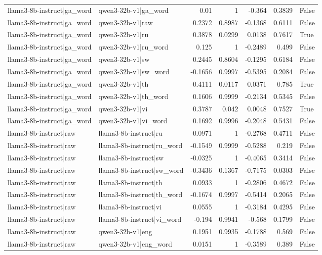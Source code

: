 \begin{table}
\begin{tabular}{l l r r r r l}
llama3-8b-instruct|ga_word & qwen3-32b-v1|ga_word & 0.01 & 1 & -0.364 & 0.3839 & False \\
llama3-8b-instruct|ga_word & qwen3-32b-v1|raw & 0.2372 & 0.8987 & -0.1368 & 0.6111 & False \\
llama3-8b-instruct|ga_word & qwen3-32b-v1|ru & 0.3878 & 0.0299 & 0.0138 & 0.7617 & True \\
llama3-8b-instruct|ga_word & qwen3-32b-v1|ru_word & 0.125 & 1 & -0.2489 & 0.499 & False \\
llama3-8b-instruct|ga_word & qwen3-32b-v1|sw & 0.2445 & 0.8604 & -0.1295 & 0.6184 & False \\
llama3-8b-instruct|ga_word & qwen3-32b-v1|sw_word & -0.1656 & 0.9997 & -0.5395 & 0.2084 & False \\
llama3-8b-instruct|ga_word & qwen3-32b-v1|th & 0.4111 & 0.0117 & 0.0371 & 0.785 & True \\
llama3-8b-instruct|ga_word & qwen3-32b-v1|th_word & 0.1606 & 0.9999 & -0.2134 & 0.5345 & False \\
llama3-8b-instruct|ga_word & qwen3-32b-v1|vi & 0.3787 & 0.042 & 0.0048 & 0.7527 & True \\
llama3-8b-instruct|ga_word & qwen3-32b-v1|vi_word & 0.1692 & 0.9996 & -0.2048 & 0.5431 & False \\
llama3-8b-instruct|raw & llama3-8b-instruct|ru & 0.0971 & 1 & -0.2768 & 0.4711 & False \\
llama3-8b-instruct|raw & llama3-8b-instruct|ru_word & -0.1549 & 0.9999 & -0.5288 & 0.219 & False \\
llama3-8b-instruct|raw & llama3-8b-instruct|sw & -0.0325 & 1 & -0.4065 & 0.3414 & False \\
llama3-8b-instruct|raw & llama3-8b-instruct|sw_word & -0.3436 & 0.1367 & -0.7175 & 0.0303 & False \\
llama3-8b-instruct|raw & llama3-8b-instruct|th & 0.0933 & 1 & -0.2806 & 0.4672 & False \\
llama3-8b-instruct|raw & llama3-8b-instruct|th_word & -0.1674 & 0.9997 & -0.5414 & 0.2065 & False \\
llama3-8b-instruct|raw & llama3-8b-instruct|vi & 0.0555 & 1 & -0.3184 & 0.4295 & False \\
llama3-8b-instruct|raw & llama3-8b-instruct|vi_word & -0.194 & 0.9941 & -0.568 & 0.1799 & False \\
llama3-8b-instruct|raw & qwen3-32b-v1|eng & 0.1951 & 0.9935 & -0.1788 & 0.569 & False \\
llama3-8b-instruct|raw & qwen3-32b-v1|eng_word & 0.0151 & 1 & -0.3589 & 0.389 & False \\

\end{tabular}
\end{table}
